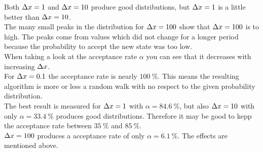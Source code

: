 Both $\Delta x=1$ and $\Delta x=10$ produce good distributions, but $\Delta x=1$ is a little better than $\Delta x=10$.\\

The many small peaks in the distribution for $\Delta x=100$ show that $\Delta x=100$ is to high.
The peaks come from values which did not change for a longer period because the probability to accept the new state was too low.\\

When taking a look at the acceptance rate $\alpha$ you can see that it decreases with increasing $\Delta x$.\\

For $\Delta x=0.1$ the acceptance rate is nearly $\SI{100}{\percent}$. 
This means the resulting algorithm is more or less a random walk with no respect to the given probability distribution.\\

The best result is measured for $\Delta x=1$ with $\alpha =\SI{84.6}{\percent}$, but also $\Delta x=10$ with only $\alpha =\SI{33.4}{\percent}$ produces good distributions.
Therefore it may be good to kepp the acceptance rate between $\SI{35}{\percent}$ and $\SI{85}{\percent}$.\\

$\Delta x=100$ produces a acceptance rate of only $\alpha =\SI{6.1}{\percent}$. 
The effects are mentioned above.

\FloatBarrier